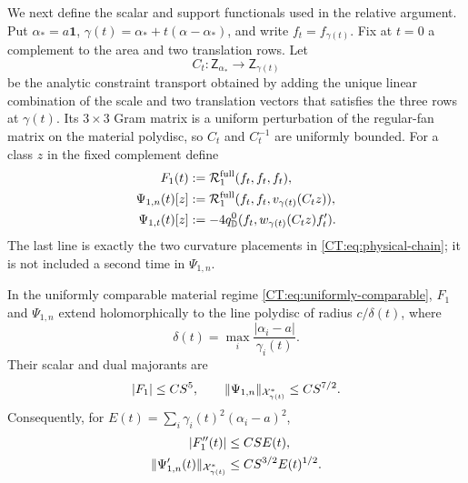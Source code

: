 We next define the scalar and support functionals used in the relative
argument.  Put $\alpha_*=a\mathbf1$,
$\gamma(t)=\alpha_*+t(\alpha-\alpha_*)$, and write
$f_t=f_{\gamma(t)}$.  Fix at $t=0$ a complement to the area and two
translation rows.  Let
\begin{equation}\label{CT:eq:constraint-transport}
 C_t:\mathsf Z_{\alpha_*}\longrightarrow\mathsf Z_{\gamma(t)}
\end{equation}
be the analytic constraint transport obtained by adding the unique linear
combination of the scale and two translation vectors that satisfies the
three rows at $\gamma(t)$.  Its $3\times3$ Gram matrix is a uniform
perturbation of the regular-fan matrix on the material polydisc, so $C_t$
and $C_t^{-1}$ are uniformly bounded.  For a class $z$ in the fixed
complement define
\begin{align}
 F_1(t)&:=\mathcal R_1^{\rm full}(f_t,f_t,f_t),\label{CT:eq:F1-definition}\\
 \Psi_{1,n}(t)[z]
 &:=\mathcal R_1^{\rm full}(f_t,f_t,v_{\gamma(t)}(C_tz)),
 \label{CT:eq:Psi1n-definition}\\
\Psi_{1,t}(t)[z]
 &:=-4q_{\mathbb D}^{0}
 (f_t,w_{\gamma(t)}(C_tz)f_t').
 \label{CT:eq:Psi1t-definition}
\end{align}
The last line is exactly the two curvature placements in
\eqref{CT:eq:physical-chain}; it is not included a second time in
$\Psi_{1,n}$.

\begin{lemma}
\label{CT:lem:R-Cauchy}
In the uniformly comparable material regime
\eqref{CT:eq:uniformly-comparable}, $F_1$ and $\Psi_{1,n}$ extend
holomorphically to the line polydisc of radius $c/\delta(t)$, where
\begin{equation*}
 \delta(t)=\max_i\frac{|\alpha_i-a|}{\gamma_i(t)}.
\end{equation*}
Their scalar and dual majorants are
\begin{equation}\label{CT:eq:R-complex-majorants}
 |F_1|\le CS^5,\qquad
 \|\Psi_{1,n}\|_{\mathcal X_{\gamma(t)}^*}\le CS^{7/2}.
\end{equation}
Consequently, for
$E(t)=\sum_i\gamma_i(t)^2(\alpha_i-a)^2$,
\begin{align}
 |F_1''(t)|&\le CSE(t),\label{CT:eq:F1-Cauchy}\\
 \|\Psi_{1,n}'(t)\|_{\mathcal X_{\gamma(t)}^*}
 &\le CS^{3/2}E(t)^{1/2}.\label{CT:eq:Psi1n-Cauchy}
\end{align}
\end{lemma}

